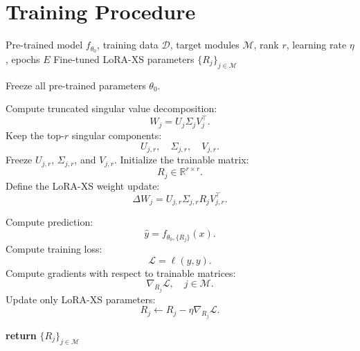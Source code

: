\documentclass[11pt]{article}
\begin{document}
	
	\section{Training Procedure}
	
	\begin{algorithm}[t]
		\caption{LoRA-XS Training Procedure}
		\label{alg:loraxs}
		\begin{algorithmic}[1]
			\Require Pre-trained model $f_{\theta_0}$, training data $\mathcal{D}$, target modules $\mathcal{M}$, rank $r$, learning rate $\eta$, epochs $E$
			\Ensure Fine-tuned LoRA-XS parameters $\{R_j\}_{j\in\mathcal{M}}$
			
			\State Freeze all pre-trained parameters $\theta_0$.
			
			\State Compute truncated singular value decomposition:
			\[
			W_j = U_j \Sigma_j V_j^\top .
			\]
			\State Keep the top-$r$ singular components:
			\[
			U_{j,r}, \quad \Sigma_{j,r}, \quad V_{j,r}.
			\]
			\State Freeze $U_{j,r}$, $\Sigma_{j,r}$, and $V_{j,r}$.
			\State Initialize the trainable matrix:
			\[
			R_j \in \mathbb{R}^{r\times r}.
			\]
			\State Define the LoRA-XS weight update:
			\[
			\Delta W_j
			=
			U_{j,r}\Sigma_{j,r}R_jV_{j,r}^{\top}.
			\]
			\EndFor
			
			\State Compute prediction:
			\[
			\hat{y}=f_{\theta_0,\{R_j\}}(x).
			\]
			\State Compute training loss:
			\[
			\mathcal{L}=\ell(\hat{y},y).
			\]
			\State Compute gradients with respect to trainable matrices:
			\[
			\nabla_{R_j}\mathcal{L}, \quad j\in\mathcal{M}.
			\]
			\State Update only LoRA-XS parameters:
			\[
			R_j \leftarrow R_j-\eta\nabla_{R_j}\mathcal{L}.
			\]
			\EndFor
			\EndFor
			
			\State \textbf{return} $\{R_j\}_{j\in\mathcal{M}}$
		\end{algorithmic}
	\end{algorithm}
	
\end{document}
